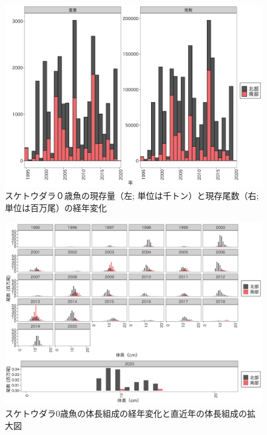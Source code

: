 \documentclass[11pt]{article} %
\begin{document}
\begin{linenumbers}
\begin{figure}[h]
  \centering
  \includegraphics[width = 14cm]{スケトウダラ０＋trend.png}
  \caption{スケトウダラ０歳魚の現存量（左; 単位は千トン）と現存尾数（右; 単位は百万尾）の経年変化}
\end{figure}

\begin{figure}[h]
  \centering
  \includegraphics[width = 14cm]{スケトウダラ0+length.png}
  \caption{スケトウダラ0歳魚の体長組成の経年変化と直近年の体長組成の拡大図}
\end{figure}


\end{linenumbers}
\end{document}

